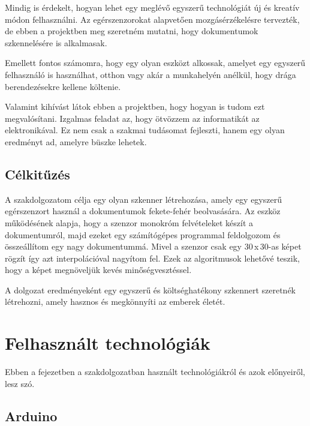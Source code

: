 \documentclass[]{thesis-ekf}
\theoremstyle{definition}
\theoremstyle{remark}
\begin{document}
Mindig is érdekelt, hogyan lehet egy meglévő egyszerű technológiát új és kreatív módon felhasználni. Az egérszenzorokat alapvetően mozgásérzékelésre tervezték, de ebben a projektben meg szeretném mutatni, hogy dokumentumok szkennelésére is alkalmasak.

Emellett fontos számomra, hogy egy olyan eszközt alkossak, amelyet egy egyszerű felhasználó is használhat, otthon vagy akár a munkahelyén anélkül, hogy drága berendezésekre kellene költenie. 

Valamint kihívást látok ebben a projektben, hogy hogyan is tudom ezt megvalósítani. Izgalmas feladat az, hogy ötvözzem az informatikát az elektronikával. Ez nem csak a szakmai tudásomat fejleszti, hanem egy olyan eredményt ad, amelyre büszke lehetek.
\section{Célkitűzés}
A szakdolgozatom\cite{szakdolgozat} célja egy olyan szkenner létrehozása, amely egy egyszerű egérszenzort használ a dokumentumok fekete-fehér beolvasására. Az eszköz működésének alapja, hogy a szenzor monokróm felvételeket készít a dokumentumról, majd ezeket egy számítógépes programmal feldolgozom és összeállítom egy nagy dokumentummá. Mivel a szenzor csak egy 30\,x\,30-as képet rögzít így azt interpolációval nagyítom fel. Ezek az algoritmusok lehetővé teszik, hogy a képet megnöveljük kevés minőségvesztéssel. 

A dolgozat eredményeként egy egyszerű és költséghatékony szkennert szeretnék létrehozni, amely hasznos és megkönnyíti az emberek életét.
\chapter{Felhasznált technológiák}
Ebben a fejezetben a szakdolgozatban használt technológiákról és azok előnyeiről, lesz szó.
\section{Arduino}
\end{document}
